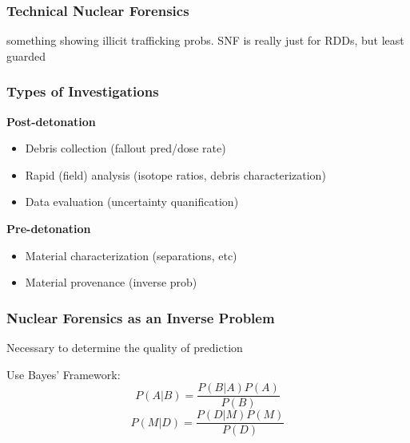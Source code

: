 
\begin{frame}
  \frametitle{Technical Nuclear Forensics}
  something showing illicit trafficking probs. SNF is really just for RDDs, 
  but least guarded
\end{frame}

\begin{frame}
  \frametitle{Types of Investigations}
  \textbf{Post-detonation}
  \begin{itemize}
    \item Debris collection (fallout pred/dose rate)
    \item Rapid (field) analysis (isotope ratios, debris characterization)
    \item Data evaluation (uncertainty quanification)
  \end{itemize}

  \textbf{Pre-detonation}
  \begin{itemize}
    \item Material characterization (separations, etc)
    \item Material provenance (inverse prob)
  \end{itemize}
\end{frame}


\begin{frame}
  \frametitle{Nuclear Forensics as an Inverse Problem}
  Necessary to determine the quality of prediction

  Use Bayes' Framework:
  $$ P(A|B) = \frac{P(B|A)P(A)}{P(B)} $$
  $$ P(M|D) = \frac{P(D|M)P(M)}{P(D)} $$
\end{frame}

